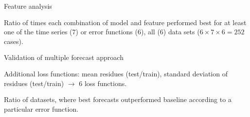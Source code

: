 \documentclass{beamer}
\begin{document}
\begin{frame}{Feature analysis}


Ratio of times each combination of model and feature performed best for at least one of the time series (7) or error functions (6), all (6) data sets ($ 6\times 7\times 6 = 252$  cases).

\end{frame}
\begin{frame}{Validation of multiple forecast approach}

Additional loss functions: mean residues (test/train), standard deviation of residues (test/train) $\rightarrow$ 6 loss functions.


Ratio of datasets, where best forecasts outperformed baseline according to a particular error function.

\end{frame}
\end{document}
